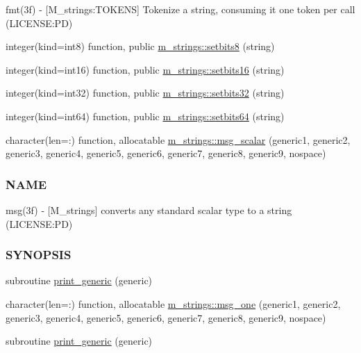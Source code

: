 \begin{DoxyCompactItemize}
\begin{DoxyCompactList}
fmt(3f) -\/ \mbox{[}M\+\_\+strings\+:T\+O\+K\+E\+NS\mbox{]} Tokenize a string, consuming it one token per call (L\+I\+C\+E\+N\+SE\+:PD) \end{DoxyCompactList}\item 
integer(kind=int8) function, public \mbox{\hyperlink{namespacem__strings_acc1854720186b8a5582a339d1cbb134b}{m\+\_\+strings\+::setbits8}} (string)
\item 
integer(kind=int16) function, public \mbox{\hyperlink{namespacem__strings_a536b90500130aa47bde4def7ecd5f6aa}{m\+\_\+strings\+::setbits16}} (string)
\item 
integer(kind=int32) function, public \mbox{\hyperlink{namespacem__strings_a44fd7db30f28fd30086eff1a59fbfa7e}{m\+\_\+strings\+::setbits32}} (string)
\item 
integer(kind=int64) function, public \mbox{\hyperlink{namespacem__strings_a3d005819ec07b086dbc6d1c197834142}{m\+\_\+strings\+::setbits64}} (string)
\item 
character(len=\+:) function, allocatable \mbox{\hyperlink{namespacem__strings_a926d1d9f529487149f4e0a1de8294122}{m\+\_\+strings\+::msg\+\_\+scalar}} (generic1, generic2, generic3, generic4, generic5, generic6, generic7, generic8, generic9, nospace)
\begin{DoxyCompactList}\small\item\em \subsubsection*{N\+A\+ME}

msg(3f) -\/ \mbox{[}M\+\_\+strings\mbox{]} converts any standard scalar type to a string (L\+I\+C\+E\+N\+SE\+:PD) \subsubsection*{S\+Y\+N\+O\+P\+S\+IS}\end{DoxyCompactList}\item 
subroutine \mbox{\hyperlink{M__strings_8f90_aaa8ee15f943d8e1543ae35ab732c3cd2}{print\+\_\+generic}} (generic)
\item 
character(len=\+:) function, allocatable \mbox{\hyperlink{namespacem__strings_a52d27df9dcea52039c6feccb782ec4fd}{m\+\_\+strings\+::msg\+\_\+one}} (generic1, generic2, generic3, generic4, generic5, generic6, generic7, generic8, generic9, nospace)
\item 
subroutine \mbox{\hyperlink{M__strings_8f90_a9d5e1620d474ac03a74eeb9b0f7d6ae1}{print\+\_\+generic}} (generic)
\end{DoxyCompactItemize}
